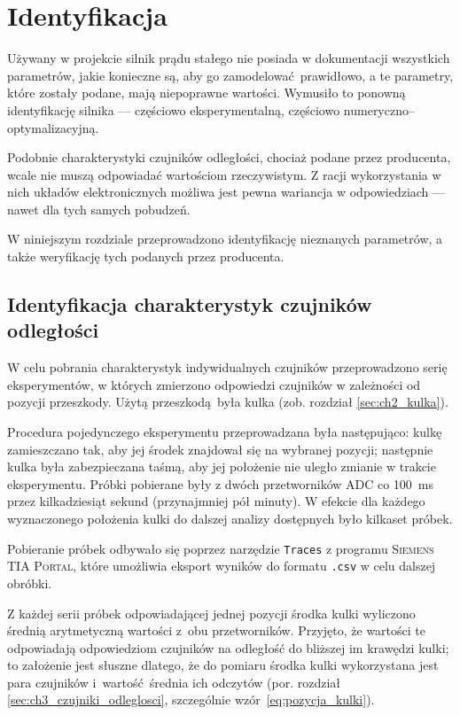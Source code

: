\chapter{Identyfikacja}
\label{cha:ch6_identyfikacja}

Używany w projekcie silnik prądu stałego nie posiada w dokumentacji wszystkich parametrów, jakie konieczne są, aby go zamodelować prawidłowo, a te parametry, które zostały podane, mają niepoprawne wartości. Wymusiło to ponowną identyfikację silnika --- częściowo eksperymentalną, częściowo numeryczno--optymalizacyjną.

Podobnie charakterystyki czujników odległości, chociaż podane przez producenta, wcale nie muszą odpowiadać wartościom rzeczywistym. Z racji wykorzystania w nich układów elektronicznych możliwa jest pewna wariancja w odpowiedziach --- nawet dla tych samych pobudzeń.

W niniejszym rozdziale przeprowadzono identyfikację nieznanych parametrów, a także weryfikację tych podanych przez producenta.

\section{Identyfikacja charakterystyk czujników odległości}
\label{sec:ch6_identyfikacja_charakterystyk_czujnikow}

W celu pobrania charakterystyk indywidualnych czujników przeprowadzono serię eksperymentów, w których zmierzono odpowiedzi czujników w zależności od pozycji przeszkody. Użytą przeszkodą była kulka (zob. rozdział \ref{sec:ch2_kulka}).

Procedura pojedynczego eksperymentu przeprowadzana była następująco: kulkę zamieszczano tak, aby jej środek znajdował się na wybranej pozycji; następnie kulka była zabezpieczana taśmą, aby jej położenie nie uległo zmianie w trakcie eksperymentu. Próbki pobierane były z dwóch przetworników ADC co \SI{100}{\milli\second} przez kilkadziesiąt sekund (przynajmniej pół minuty). W efekcie dla każdego wyznaczonego położenia kulki do dalszej analizy dostępnych było kilkaset próbek.

Pobieranie próbek odbywało się poprzez narzędzie \texttt{Traces} z programu \textsc{Siemens TIA Portal}, które umożliwia eksport wyników do formatu \texttt{.csv} w celu dalszej obróbki.

Z każdej serii próbek odpowiadającej jednej pozycji środka kulki wyliczono średnią arytmetyczną wartości z~obu przetworników. Przyjęto, że wartości te odpowiadają odpowiedziom czujników na odległość do bliższej im krawędzi kulki; to założenie jest słuszne dlatego, że do pomiaru środka kulki wykorzystana jest para czujników i~wartość średnia ich odczytów (por. rozdział \ref{sec:ch3_czujniki_odleglosci}, szczególnie wzór~\eqref{eq:pozycja_kulki}).

